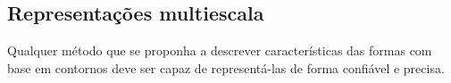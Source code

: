 



\subsection{Representações multiescala\label{chap:multiescala}} 

Qualquer método que se proponha a descrever características das formas com base em contornos deve ser capaz de representá-las de forma confiável e precisa. 

\begin{comment}Segundo \citeonline{149591}, esses devem satisfazer os seguintes requisitos:

\begin{alineas}
\item Invariância: duas curvas que tenham a mesma forma devem ter a mesma representação;
\item Unicidade: duas curvas que não tenham a mesma forma devem apresentar diferentes representações;
\item Estabilidade: pequenas variações observadas entre duas curvas devem resultar em pequenas variações em suas representações;
\item Eficiência: uma vez que alguns sistemas de visão computacional apresentam requisitos de tempo real, a descrição deve ser computacionalmente eficaz, demandando poucos recursos de memória e de processamento;
\item Fácil implementação: é recomendável que os métodos de descrição sejam simples e de fácil implementação de modo a requerer menos tempo de implementação e depuração; 
\item Relação com propriedades específicas das formas: o método de descrição deve ser capaz de representar propriedades das formas que este descreve.
\end{alineas}

Os referidos autores afirmam que muitos dos métodos de extração encontrados em visão computacional falharam em satisfazer um ou mais dentre estes requisitos.
\end{comment}

